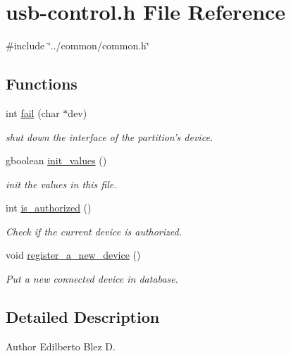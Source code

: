 \hypertarget{usb-control_8h}{
\section{usb-\/control.h File Reference}
\label{usb-control_8h}
}
{\ttfamily \#include \char`\"{}../common/common.h\char`\"{}}\par
\subsection*{Functions}
\begin{DoxyCompactItemize}
\item 
int \hyperlink{usb-control_8h_ab9932ed1777b7d0acf1e366fdd73ef3e}{fail} (char $\ast$dev)
\begin{DoxyCompactList}\small\item\em shut down the interface of the partition's device. \item\end{DoxyCompactList}\item 
gboolean \hyperlink{usb-control_8h_abc3e9b8557ead2451394660134b421f7}{init\_\-values} ()
\begin{DoxyCompactList}\small\item\em init the values in this file. \item\end{DoxyCompactList}\item 
int \hyperlink{usb-control_8h_a07d78dafcde5f5109f5cebe323b1d401}{is\_\-authorized} ()
\begin{DoxyCompactList}\small\item\em Check if the current device is authorized. \item\end{DoxyCompactList}\item 
void \hyperlink{usb-control_8h_a10395957994d66e936a4cb1e68fe47aa}{register\_\-a\_\-new\_\-device} ()
\begin{DoxyCompactList}\small\item\em Put a new connected device in database. \item\end{DoxyCompactList}\end{DoxyCompactItemize}


\subsection{Detailed Description}
\begin{DoxyAuthor}{Author}
Edilberto Blez D. 
\end{DoxyAuthor}


